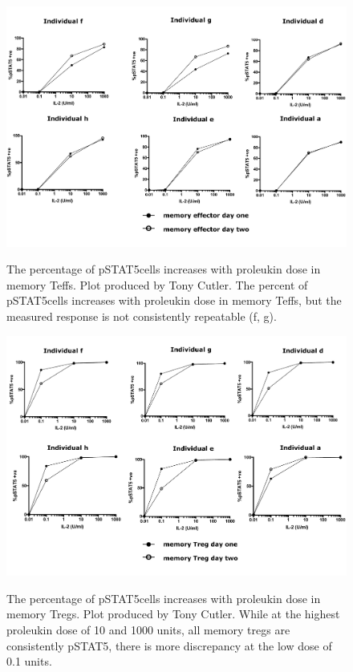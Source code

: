 \begin{figure}
\centering
%
\begin{minipage}{.65\textwidth}
\includegraphics[width=\linewidth]{figures/tony-memory-eff}
\end{minipage}
\begin{minipage}{\textwidth}
{ The percentage of pSTAT5\positive cells increases with proleukin dose in memory Teffs.  }
{
    Plot produced by Tony Cutler.
    The percent of pSTAT5\positive cells increases with proleukin dose in memory Teffs, but the measured response is not consistently repeatable (f, g).
}
\end{minipage}
%
\begin{minipage}{.65\textwidth}
\includegraphics[width=\linewidth]{figures/tony-memory-treg}
\end{minipage}
\begin{minipage}{\textwidth}
{ The percentage of pSTAT5\positive cells increases with proleukin dose in memory Tregs. }
{
  Plot produced by Tony Cutler.
  While at the highest proleukin dose of 10 and 1000 units, all memory tregs are consistently pSTAT5\positive,
  there is more discrepancy at the low dose of 0.1 units.
}
\end{minipage}
\end{figure}


